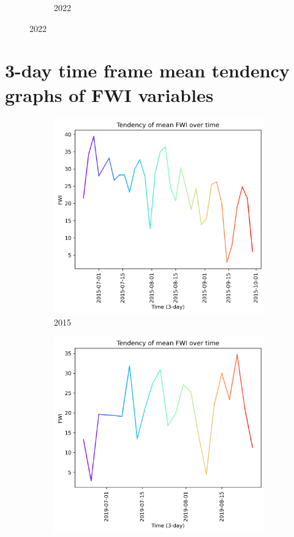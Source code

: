 \begin{figure}[h]
\begin{subfigure}{0.45\textwidth}
		\caption{2022}
	\end{subfigure}
	\label{fig:daily_bui_dif_maxmin}
\end{figure}


\FloatBarrier

\section{3-day time frame mean tendency graphs of FWI variables}
\begin{figure}[h]
	\caption{FWI mean tendency graph}
	\centering
	\begin{subfigure}{0.49\textwidth}
		\centering
		\includegraphics[width=\textwidth]{graphs/2015/tendency/2015_tendency_graph_FWI.png}
		\caption{2015}
		\label{fig:mean_tendency_fwi_2015}
	\end{subfigure}
	\hfill
	\begin{subfigure}{0.49\textwidth}
		\centering
		\includegraphics[width=\textwidth]{graphs/2019/tendency/2019_tendency_graph_FWI.png}

\end{subfigure}
\end{figure}
